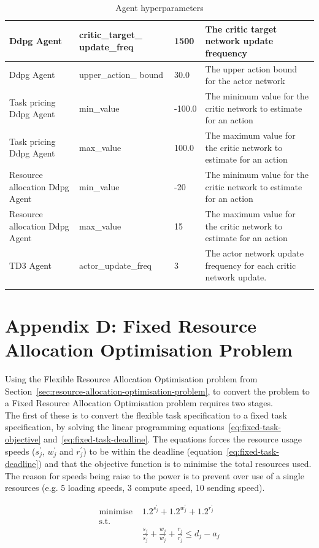 \begin{longtable}{|p{2cm}|p{3.5cm}|p{2.5cm}|p{6cm}|}
        Ddpg Agent & critic\_target\_ update\_freq & 1500 & The critic target network update frequency \\ \hline
        Ddpg Agent & upper\_action\_ bound & 30.0 & The upper action bound for the actor network \\ \hline
        Task pricing Ddpg Agent & min\_value & -100.0 & The minimum value for the critic network to estimate for an
            action \\ \hline
        Task pricing Ddpg Agent & max\_value & 100.0 & The maximum value for the critic network to estimate for an
            action\\ \hline
        Resource allocation Ddpg Agent & min\_value & -20 & The minimum value for the critic network to estimate for an
            action \\ \hline
        Resource allocation Ddpg Agent & max\_value & 15 & The maximum value for the critic network to estimate for an
            action\\ \hline
        TD3 Agent & actor\_update\_freq & 3 & The actor network update frequency for each critic network update. \\ \hline
    \caption{Agent hyperparameters}
    \label{tab:agent_hyperparameters}
\end{longtable}

\section*{Appendix D: Fixed Resource Allocation Optimisation Problem}
\label{app:fixed-resource-allocation-optimisation-problem}
Using the Flexible Resource Allocation Optimisation problem from Section~\ref{sec:resource-allocation-optimisation-problem},
to convert the problem to a Fixed Resource Allocation Optimisation problem requires two stages. \\
The first of these is to convert the flexible task specification to a fixed task specification, by solving the linear
programming equations~\ref{eq:fixed-task-objective} and~\ref{eq:fixed-task-deadline}. The equations forces the resource
usage speeds ($s^{'}_j$, $w^{'}_j$ and $r^{'}_j$) to be within the deadline (equation~\ref{eq:fixed-task-deadline}) and
that the objective function is to minimise the total resources used. The reason for speeds being raise to the power is
to prevent over use of a single resources (e.g. 5 loading speeds, 3 compute speed, 10 sending speed).

\begin{align}
    \text{minimise  } & 1.2^{s^{'}_j} + 1.2^{w^{'}_j} + 1.2^{r^{'}_j} \label{eq:fixed-task-objective} \\
    \mbox{s.t.} \nonumber \\
    & \frac{s_j}{s^{'}_j} + \frac{w_j}{w^{'}_j} + \frac{r_j}{r^{'}_j} \leq d_j - a_j \label{eq:fixed-task-deadline} \\
\end{align}

